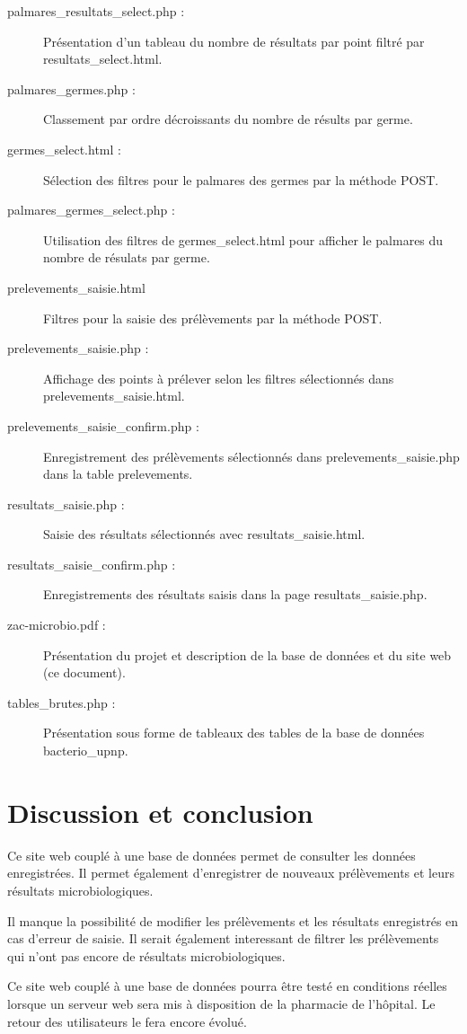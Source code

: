 \documentclass[12pt,a4paper,oneside]{article}
\begin{document}
\begin{description}
\item[palmares\_resultats\_select.php :] Présentation d'un tableau du nombre de résultats par point filtré par resultats\_select.html.
\item[palmares\_germes.php :] Classement par ordre décroissants du nombre de résults par germe.
\item[germes\_select.html :] Sélection des filtres pour le palmares des germes par la méthode POST.
\item[palmares\_germes\_select.php :] Utilisation des filtres de germes\_select.html pour afficher le palmares du nombre de résulats par germe.
\item[prelevements\_saisie.html] Filtres pour la saisie des prélèvements par la méthode POST.
\item[prelevements\_saisie.php :] Affichage des points à prélever selon les filtres sélectionnés dans prelevements\_saisie.html.
\item[prelevements\_saisie\_confirm.php :] Enregistrement des prélèvements sélectionnés dans prelevements\_saisie.php dans la table prelevements.
\item[resultats\_saisie.php :] Saisie des résultats sélectionnés avec resultats\_saisie.html.
\item[resultats\_saisie\_confirm.php :] Enregistrements des résultats saisis dans la page resultats\_saisie.php.
\item[zac-microbio.pdf :] Présentation du projet et description de la base de données et du site web (ce document).
\item[tables\_brutes.php :] Présentation sous forme de tableaux des tables de la base de données bacterio\_upnp.


\end{description}

\section{Discussion et conclusion}
Ce site web couplé à une base de données permet de consulter les données enregistrées. Il permet également d'enregistrer de nouveaux prélèvements et leurs résultats microbiologiques.

Il manque la possibilité de modifier les prélèvements et les résultats enregistrés en cas d'erreur de saisie. Il serait également interessant de filtrer les prélèvements qui n'ont pas encore de résultats microbiologiques.

Ce site web couplé à une base de données pourra être testé en conditions réelles lorsque un serveur web sera mis à disposition de la pharmacie de l'hôpital. Le retour des utilisateurs le fera encore évolué.
\end{document}
